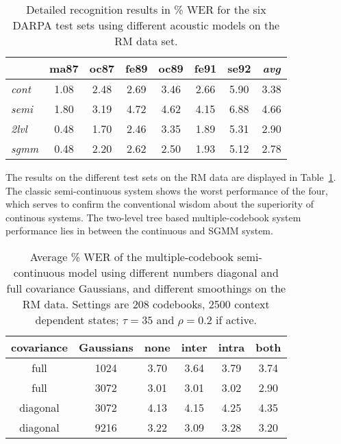 \documentclass{article}
\begin{document}
\begin{table}%
\begin{center}
\begin{tabular}{|l||c|c|c|c|c|c||c|}
\hline
~               & ma87 & oc87 & fe89 & oc89 & fe91 & se92 & {\em avg}  \\ \hline\hline
{\em cont} &  1.08 &  2.48 &  2.69 &  3.46 &  2.66 &  5.90 & 3.38 \\ \hline
{\em semi} &  1.80 &  3.19 &  4.72 &  4.62 &  4.15 &  6.88 & 4.66 \\ \hline 
{\em 2lvl} &  0.48 &  1.70 &  2.46 &  3.35 &  1.89 &  5.31 & 2.90 \\ \hline
{\em sgmm} &  0.48 &  2.20 &  2.62 &  2.50 &  1.93 &  5.12 & 2.78 \\ \hline
\end{tabular}
\end{center}
\caption{\label{tab:res_rm}
Detailed recognition results in \% WER for the six DARPA test sets using 
different acoustic models on the RM data set.
}
\end{table}

The results on the different test sets on the RM data are displayed in 
Table~\ref{tab:res_rm}. The classic semi-continuous system shows the worst 
performance of the four, which serves to confirm the conventional wisdom
about the superiority of continous systems.
The two-level tree based multiple-codebook system performance lies in between the 
continuous and SGMM system.



\begin{table}%
\begin{center}
\begin{tabular}{|c|c||c|c|c|c|}
\hline
covariance & Gaussians & none & inter & intra & both \\ \hline\hline
full       &      1024 & 3.70 & 3.64 & 3.79 & 3.74 \\ \hline
full       &      3072 & 3.01 & 3.01 & 3.02 & 2.90 \\ \hline\hline
diagonal   &      3072 & 4.13 & 4.15 & 4.25 & 4.35 \\ \hline
diagonal   &      9216 & 3.22 & 3.09 & 3.28 & 3.20 \\ \hline
\end{tabular}
\end{center}
\caption{\label{tab:rm_diagfull}
Average \% WER of the multiple-codebook semi-continuous model using different 
numbers diagonal and full covariance Gaussians, and different smoothings 
on the RM data. 
Settings are 208 codebooks, 2500 context dependent states; $\tau = 35$ 
and $\rho = 0.2$ if active.
}
\end{table}
\end{document}
